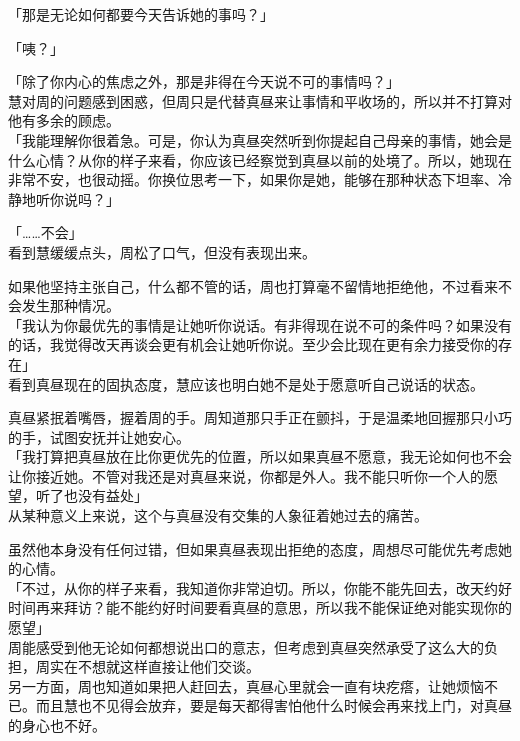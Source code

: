「那是无论如何都要今天告诉她的事吗？」

「咦？」

「除了你内心的焦虑之外，那是非得在今天说不可的事情吗？」\\

慧对周的问题感到困惑，但周只是代替真昼来让事情和平收场的，所以并不打算对他有多余的顾虑。\\

「我能理解你很着急。可是，你认为真昼突然听到你提起自己母亲的事情，她会是什么心情？从你的样子来看，你应该已经察觉到真昼以前的处境了。所以，她现在非常不安，也很动摇。你换位思考一下，如果你是她，能够在那种状态下坦率、冷静地听你说吗？」

「……不会」\\

看到慧缓缓点头，周松了口气，但没有表现出来。

如果他坚持主张自己，什么都不管的话，周也打算毫不留情地拒绝他，不过看来不会发生那种情况。\\

「我认为你最优先的事情是让她听你说话。有非得现在说不可的条件吗？如果没有的话，我觉得改天再谈会更有机会让她听你说。至少会比现在更有余力接受你的存在」\\

看到真昼现在的固执态度，慧应该也明白她不是处于愿意听自己说话的状态。

真昼紧抿着嘴唇，握着周的手。周知道那只手正在颤抖，于是温柔地回握那只小巧的手，试图安抚并让她安心。\\

「我打算把真昼放在比你更优先的位置，所以如果真昼不愿意，我无论如何也不会让你接近她。不管对我还是对真昼来说，你都是外人。我不能只听你一个人的愿望，听了也没有益处」\\

从某种意义上来说，这个与真昼没有交集的人象征着她过去的痛苦。

虽然他本身没有任何过错，但如果真昼表现出拒绝的态度，周想尽可能优先考虑她的心情。\\

「不过，从你的样子来看，我知道你非常迫切。所以，你能不能先回去，改天约好时间再来拜访？能不能约好时间要看真昼的意思，所以我不能保证绝对能实现你的愿望」\\

周能感受到他无论如何都想说出口的意志，但考虑到真昼突然承受了这么大的负担，周实在不想就这样直接让他们交谈。\\

另一方面，周也知道如果把人赶回去，真昼心里就会一直有块疙瘩，让她烦恼不已。而且慧也不见得会放弃，要是每天都得害怕他什么时候会再来找上门，对真昼的身心也不好。\\

